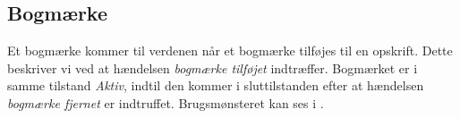 \subsection{Bogmærke}
Et bogmærke kommer til verdenen når et bogmærke tilføjes til en opskrift. Dette beskriver vi ved at hændelsen \textit{bogmærke tilføjet} indtræffer. Bogmærket er i samme tilstand \textit{Aktiv}, indtil den kommer i sluttilstanden efter at hændelsen \textit{bogmærke fjernet} er indtruffet. Brugsmønsteret kan ses i .
\begin{figure}[htp]
\centering
\scalebox{0.6}{
}
\label{fig:bogmaerke-adfaerd}
\end{figure}